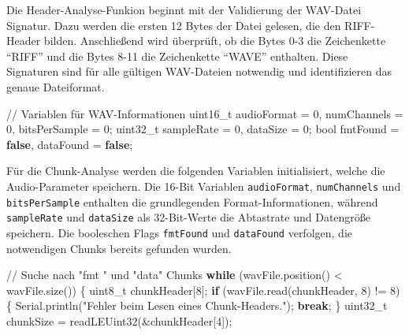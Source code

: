 \documentclass[
  ngerman,
  letterpaper,
  DIV=11]{scrreprt}
\newenvironment{Shaded}{\begin{snugshade}}{\end{snugshade}}
\newcommand{\CommentTok}[1]{\textcolor[rgb]{0.37,0.37,0.37}{#1}}
\newcommand{\ControlFlowTok}[1]{\textcolor[rgb]{0.00,0.23,0.31}{\textbf{#1}}}
\newcommand{\DataTypeTok}[1]{\textcolor[rgb]{0.68,0.00,0.00}{#1}}
\newcommand{\DecValTok}[1]{\textcolor[rgb]{0.68,0.00,0.00}{#1}}
\newcommand{\KeywordTok}[1]{\textcolor[rgb]{0.00,0.23,0.31}{\textbf{#1}}}
\newcommand{\NormalTok}[1]{\textcolor[rgb]{0.00,0.23,0.31}{#1}}
\newcommand{\OperatorTok}[1]{\textcolor[rgb]{0.37,0.37,0.37}{#1}}
\newcommand{\StringTok}[1]{\textcolor[rgb]{0.13,0.47,0.30}{#1}}
\begin{document}
Die Header-Analyse-Funkion beginnt mit der Validierung der WAV-Datei
Signatur. Dazu werden die ersten 12 Bytes der Datei gelesen, die den
RIFF-Header bilden. Anschließend wird überprüft, ob die Bytes 0-3 die
Zeichenkette ``RIFF'' und die Bytes 8-11 die Zeichenkette ``WAVE''
enthalten. Diese Signaturen sind für alle gültigen WAV-Dateien notwendig
und identifizieren das genaue Dateiformat.

\begin{Shaded}
\begin{Highlighting}[]
\CommentTok{// Variablen für WAV{-}Informationen}
\DataTypeTok{uint16\_t}\NormalTok{ audioFormat }\OperatorTok{=} \DecValTok{0}\OperatorTok{,}\NormalTok{ numChannels }\OperatorTok{=} \DecValTok{0}\OperatorTok{,}\NormalTok{ bitsPerSample }\OperatorTok{=} \DecValTok{0}\OperatorTok{;}
\DataTypeTok{uint32\_t}\NormalTok{ sampleRate }\OperatorTok{=} \DecValTok{0}\OperatorTok{,}\NormalTok{ dataSize }\OperatorTok{=} \DecValTok{0}\OperatorTok{;}
\DataTypeTok{bool}\NormalTok{ fmtFound }\OperatorTok{=} \KeywordTok{false}\OperatorTok{,}\NormalTok{ dataFound }\OperatorTok{=} \KeywordTok{false}\OperatorTok{;}
\end{Highlighting}
\end{Shaded}

Für die Chunk-Analyse werden die folgenden Variablen initialisiert,
welche die Audio-Parameter speichern. Die 16-Bit Variablen
\texttt{audioFormat}, \texttt{numChannels} und \texttt{bitsPerSample}
enthalten die grundlegenden Format-Informationen, während
\texttt{sampleRate} und \texttt{dataSize} als 32-Bit-Werte die
Abtastrate und Datengröße speichern. Die booleschen Flags
\texttt{fmtFound} und \texttt{dataFound} verfolgen, die notwendigen
Chunks bereits gefunden wurden.

\begin{Shaded}
\begin{Highlighting}[]
\CommentTok{// Suche nach "fmt " und "data" Chunks}
\ControlFlowTok{while} \OperatorTok{(}\NormalTok{wavFile}\OperatorTok{.}\NormalTok{position}\OperatorTok{()} \OperatorTok{\textless{}}\NormalTok{ wavFile}\OperatorTok{.}\NormalTok{size}\OperatorTok{())} \OperatorTok{\{}
  \DataTypeTok{uint8\_t}\NormalTok{ chunkHeader}\OperatorTok{[}\DecValTok{8}\OperatorTok{];}
  \ControlFlowTok{if} \OperatorTok{(}\NormalTok{wavFile}\OperatorTok{.}\NormalTok{read}\OperatorTok{(}\NormalTok{chunkHeader}\OperatorTok{,} \DecValTok{8}\OperatorTok{)} \OperatorTok{!=} \DecValTok{8}\OperatorTok{)} \OperatorTok{\{}
\NormalTok{    Serial}\OperatorTok{.}\NormalTok{println}\OperatorTok{(}\StringTok{"Fehler beim Lesen eines Chunk{-}Headers."}\OperatorTok{);}
    \ControlFlowTok{break}\OperatorTok{;}
  \OperatorTok{\}}
  \DataTypeTok{uint32\_t}\NormalTok{ chunkSize }\OperatorTok{=}\NormalTok{ readLEUint32}\OperatorTok{(\&}\NormalTok{chunkHeader}\OperatorTok{[}\DecValTok{4}\OperatorTok{]);}
\end{Highlighting}
\end{Shaded}
\end{document}
